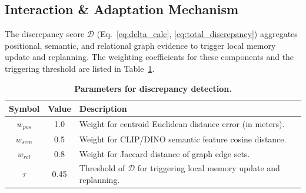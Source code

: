 \documentclass[conference]{IEEEtran}
\begin{document}
\begin{table}[h]
\centering
\caption{\textbf{Parameters for confidence-aware filtering.}}
\label{tab:supp_params_confidence}
\end{table}

\subsection{Interaction \& Adaptation Mechanism}
The discrepancy score $\mathcal{D}$ (Eq.~\ref{eq:delta_calc}, \ref{eq:total_discrepancy}) aggregates positional, semantic, and relational graph evidence to trigger local memory update and replanning. The weighting coefficients for these components and the triggering threshold are listed in Table~\ref{tab:supp_params_discrepancy}.

\begin{table}[h]
\centering
\caption{\textbf{Parameters for discrepancy detection.}}
\label{tab:supp_params_discrepancy}
\begin{tabular}{@{}ccl@{}}
\toprule
\textbf{Symbol} & \textbf{Value} & \textbf{Description} \\ \midrule
$w_{pos}$ & 1.0 & Weight for centroid Euclidean distance error (in meters). \\
$w_{sem}$ & 0.5 & Weight for CLIP/DINO semantic feature cosine distance. \\
$w_{rel}$ & 0.8 & Weight for Jaccard distance of graph edge sets. \\
$\tau$ & 0.45 & Threshold of $\mathcal{D}$ for triggering local memory update and replanning. \\ \bottomrule
\end{tabular}
\end{table}
\end{document}
